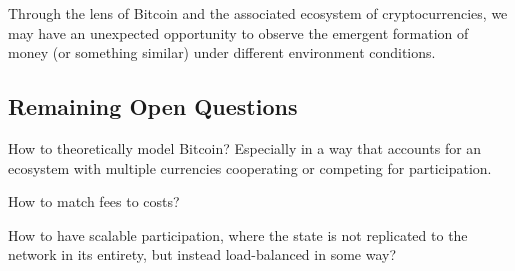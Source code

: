 Through the lens of Bitcoin and the associated ecosystem of cryptocurrencies, we may have an unexpected opportunity to observe the emergent formation of money (or something similar) under different environment conditions.

\subsection{Remaining Open Questions}

How to theoretically model Bitcoin? Especially in a way that accounts for an ecosystem with multiple currencies cooperating or competing for participation.

How to match fees to costs?

How to have scalable participation, where the state is not replicated to the network in its entirety, but instead load-balanced in some way?
